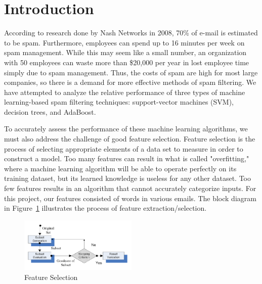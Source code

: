 \section{Introduction}
According to research done by Nash Networks \cite{choudhary} in 2008, 70\% of e-mail is estimated to be spam. Furthermore, employees can spend up to 16 minutes per week on spam management. While this may seem like a small number, an organization with 50 employees can waste more than \$20,000 per year in lost employee time simply due to spam management. Thus, the costs of spam are  high for most large companies, so there is a demand for more effective methods of spam filtering. We have attempted to analyze the relative performance of three types of machine learning-based spam filtering techniques: support-vector machines (SVM), decision trees, and AdaBoost.

To accurately assess the performance of these machine learning algorithms, we must also address the challenge of good feature selection. Feature selection is the process of selecting appropriate elements of a data set to measure in order to construct a model. Too many features can result in what is called "overfitting," where a machine learning algorithm will be able to operate perfectly on its training dataset, but its learned knowledge is useless for any other dataset. Too few features results in an algorithm that cannot accurately categorize inputs. For this project, our features consisted of words in various emails. The block diagram in Figure~\ref{fig:featureSelection} illustrates the process of feature extraction/selection. 



\begin{figure}[h]
    \centering
    \includegraphics[width=0.5\textwidth]{featureSelection}
    \caption{Feature Selection}
    \label{fig:featureSelection}
\end{figure}
